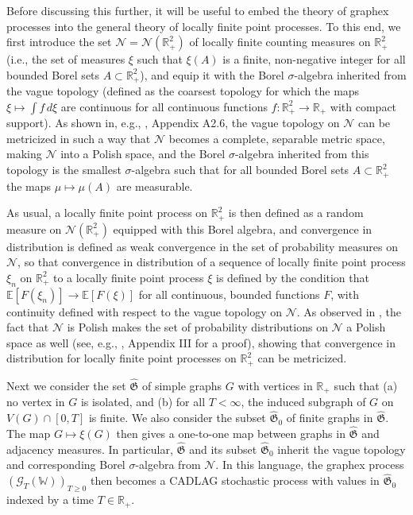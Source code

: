 \documentclass{amsart}
\numberwithin{equation}{section}
\numberwithin{figure}{section}
\theoremstyle{definition}
\theoremstyle{remark}
\newcommand{\EE}{\mathbb{E}}
\newcommand{\RR}{\mathbb{R}}
\newcommand{\cW}{\mathbb{W}}
\newcommand{\cG}{\mathcal{G}}
\newcommand{\hfG}{\hat{\mathfrak G}}
\begin{document}
Before discussing this further, it will be useful to embed the theory of
graphex processes into the general theory of locally finite point processes.
To this end, we first introduce the set $\mathcal N=\mathcal N(\RR_+^2)$ of
locally finite counting measures on $\RR^2_+$ (i.e., the set of measures
$\xi$ such that $\xi(A)$ is a finite, non-negative integer for all bounded
Borel sets $A\subset\RR_+^2$), and equip it with the Borel $\sigma$-algebra
inherited from the vague topology (defined as the coarsest topology for which
the maps $\xi\mapsto \int f \,d\xi$ are continuous for all continuous
functions $f\colon \RR_+^2\to \RR_+$ with compact support). As shown in,
e.g., \cite{DVJ03v1}, Appendix A2.6, the vague topology on $\mathcal N$ can
be metricized in such a way that $\mathcal N$ becomes a complete, separable
metric space, making $\mathcal N$ into a Polish space, and the Borel
$\sigma$-algebra inherited from this topology is the smallest
$\sigma$-algebra such that for all bounded Borel sets $A\subset\RR_+^2$ the
maps $\mu\mapsto \mu(A)$ are measurable.

As usual, a locally finite point process on $\RR_+^2$ is then defined as a
random measure on $\mathcal N(\RR^2_+)$ equipped with this Borel algebra, and
convergence in distribution is defined as weak convergence in the set of
probability measures on $\mathcal N$, so that convergence in distribution of
a sequence of locally finite point process $\xi_n$ on $\RR_+^2$ to a locally
finite point process $\xi$ is defined by the condition that $\EE[
F(\xi_n)]\to\EE [F(\xi)]$ for all continuous, bounded functions $F$, with
continuity defined with respect to the vague topology on $\mathcal N$. As
observed in \cite{JANSON17}, the fact that $\mathcal N$ is Polish makes the
set of probability distributions on $\mathcal N$ a Polish space as well (see,
e.g., \cite{Bil}, Appendix III for a proof), showing that convergence in
distribution for locally finite point processes on $\RR_+^2$ can be
metricized.

Next we consider the set $\hfG$ of simple graphs $G$ with vertices in $\RR_+$
such that (a) no vertex in $G$ is isolated, and (b) for all $T<\infty$, the
induced subgraph of $G$ on $V(G)\cap [0,T]$ is finite. We also consider the
subset $\hfG_0$ of finite graphs in $\hfG$. The map $G\mapsto \xi(G)$ then
gives a one-to-one map between graphs in $\hfG$ and adjacency measures. In
particular, $\hfG$ and its subset $\hfG_0$ inherit the vague topology and
corresponding Borel $\sigma$-algebra from $\mathcal N$. In this language, the
graphex process $(\cG_T(\cW))_{T\geq 0}$ then becomes a CADLAG stochastic
process with values in $\hfG_0$ indexed by a time $T\in \RR_+$.
\end{document}
